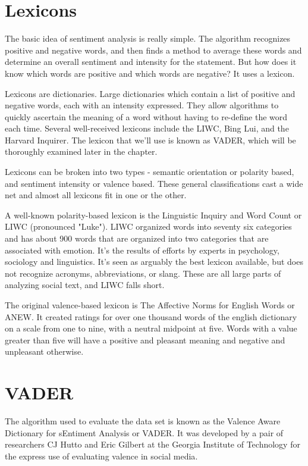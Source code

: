\documentclass[11pt, twoside, reqno]{book}
\begin{document}
\section{Lexicons}
\hspace{0.2in}The basic idea of sentiment analysis is really simple. The algorithm recognizes positive and negative words, and then finds a method to average these words and determine an overall sentiment and intensity for the statement. But how does it know which words are positive and which words are negative? It uses a lexicon. 

Lexicons are dictionaries. Large dictionaries which contain a list of positive and negative words, each with an intensity expressed. They allow algorithms to quickly ascertain the meaning of a word without having to re-define the word each time. Several well-received lexicons include the LIWC, Bing Lui, and the Harvard Inquirer. The lexicon that we'll use is known as VADER, which will be thoroughly examined later in the chapter. 

Lexicons can be broken into two types - semantic orientation or polarity based, and sentiment intensity or valence based\cite{korhonen2009automatic}. These general classifications cast a wide net and almost all lexicons fit in one or the other. 

 A well-known polarity-based lexicon is the Linguistic Inquiry and Word Count or LIWC (pronounced "Luke")\cite{liwc}. LIWC organized words into seventy six categories and has about 900 words that are organized into two categories that are associated with emotion. It's the results of efforts by experts in psychology, sociology and linguistics. It's seen as arguably the best lexicon available, but does not recognize acronyms, abbreviations, or slang\cite{vader,liwc}. These are all large parts of analyzing social text, and LIWC falls short. 

The original valence-based lexicon is The Affective Norms for English Words or ANEW. It created ratings for over one thousand words of the english dictionary on a scale from one to nine, with a neutral midpoint at five. Words with a value greater than five will have a positive and pleasant meaning and negative and unpleasant otherwise\cite{anew}. 

\section{VADER}
\hspace{0.2in}The algorithm used to evaluate the data set is known as the Valence Aware Dictionary for sEntiment Analysis or VADER. It was developed by a pair of researchers CJ Hutto and Eric Gilbert at the Georgia Institute of Technology for the express use of evaluating valence in social media\cite{vader}. 
\end{document}
